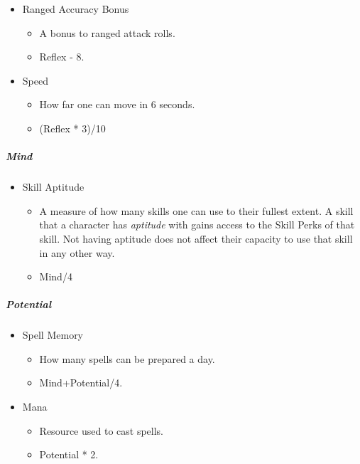 \documentclass[
]{article}
\providecommand{\tightlist}{%
  \setlength{\itemsep}{0pt}\setlength{\parskip}{0pt}}
\begin{document}
\begin{itemize}
\tightlist
\item
  Ranged Accuracy Bonus

  \begin{itemize}
  \tightlist
  \item
    A bonus to ranged attack rolls.
  \item
    Reflex - 8.
  \end{itemize}
\item
  Speed

  \begin{itemize}
  \tightlist
  \item
    How far one can move in 6 seconds.
  \item
    (Reflex * 3)/10
  \end{itemize}
\end{itemize}

\hypertarget{mind-1}{%
\subparagraph{Mind}\label{mind-1}}

\begin{itemize}
\tightlist
\item
  Skill Aptitude

  \begin{itemize}
  \tightlist
  \item
    A measure of how many skills one can use to their fullest extent. A
    skill that a character has \emph{aptitude} with gains access to the
    Skill Perks of that skill. Not having aptitude does not affect their
    capacity to use that skill in any other way.
  \item
    Mind/4
  \end{itemize}
\end{itemize}

\hypertarget{potential-1}{%
\subparagraph{Potential}\label{potential-1}}

\begin{itemize}
\tightlist
\item
  Spell Memory

  \begin{itemize}
  \tightlist
  \item
    How many spells can be prepared a day.
  \item
    Mind+Potential/4.
  \end{itemize}
\item
  Mana

  \begin{itemize}
  \tightlist
  \item
    Resource used to cast spells.
  \item
    Potential * 2.
  \end{itemize}
\end{itemize}
\end{document}
